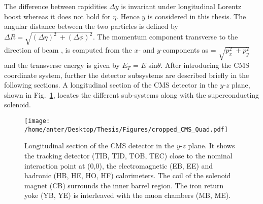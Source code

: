 The difference between rapidities $\Delta y$ is invariant under longitudinal Lorentz boost whereas it does not hold for $\eta$. Hence $y$ is considered in this thesis. The angular distance between the two particles is defined by $\Delta R = \sqrt{(\Delta \eta)^2~\plus (\Delta \phi)^2}$. The momentum component transverse to the direction of beam \pt, is computed from the $x$- and $y$-components as \pt = $\sqrt{p^2_x~\plus p^2_y}$ and the transverse energy is given by $E_T$ = $E$ sin$\theta$. After introducing the CMS coordinate system, further the detector subsystems are described briefly in the following sections. A longitudinal section of the CMS detector in the $y$-$z$ plane, shown in Fig.~\ref{fig:CMS_quad}, locates the different sub-systems along with the superconducting solenoid.

\begin{figure}[!h]
\vspace*{2mm}
\begin{center} 
\hspace*{-5mm}
\texttt{[image: /home/anter/Desktop/Thesis/Figures/cropped\_CMS\_Quad.pdf]}
\vspace{3mm}
\caption[Quad]{Longitudinal section of the CMS detector in the $y$-$z$ plane\footnotemark. It shows the tracking detector (TIB, TID, TOB, TEC) close to the nominal interaction point at (0,0), the electromagnetic (EB, EE) and hadronic (HB, HE, HO, HF) calorimeters. The coil of the solenoid magnet (CB) surrounds the inner barrel region. The iron return yoke (YB, YE) is interleaved with the muon chambers (MB, ME).}
\label{fig:CMS_quad}
\end{center}
\end{figure}

